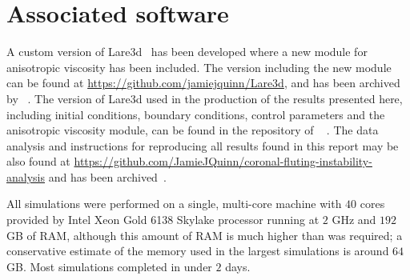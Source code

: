 \documentclass[fleqn,usenatbib]{mnras}
\newcommand{\revcite}[1]{{\color{red} \underline{#1}}}
\begin{document}



\appendix

\section{Associated software}

A custom version of Lare3d~\citep{arberStaggeredGridLagrangian2001} has been
developed where a new module for anisotropic viscosity has been included. The
version including the new module can be found at
\url{https://github.com/jamiejquinn/Lare3d}, and has been archived
by~\revcite{\citet{keith_bennett_2020_4155546}}. The version of Lare3d used in the
production of the results presented here, including initial conditions,
boundary conditions, control parameters and the anisotropic viscosity module,
can be found in the repository of ~\revcite{\citet{keith_bennett_2020_4155625}}. The data analysis and
instructions for reproducing all results found in this report may be also found
at \url{https://github.com/JamieJQuinn/coronal-fluting-instability-analysis}
and has been
archived~\citep{quinnJamieJQuinnCoronalflutinginstabilityanalysis2021}.

All simulations were performed on a single, multi-core machine with $40$ cores
provided by Intel Xeon Gold 6138 Skylake processor running at $2$ GHz and $192$
GB of RAM, although this amount of RAM is much higher than was required;
a conservative estimate of the memory used in the largest simulations is around
$64$ GB. Most simulations completed in under $2$ days.

\bsp	%
\label{lastpage}
\end{document}
